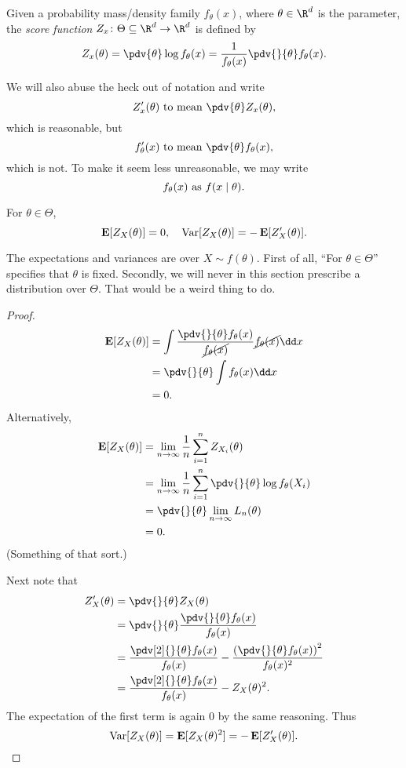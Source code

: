 \begin{definition*} \label{def:mle:convergence:score}
    Given a probability mass/density family $f_\theta(x)$,
    where $\theta \in \R^d$ is the parameter, the \emph{score function}
    $Z_x\colon \Theta \subseteq \R^d \to \R^d$ is defined by
    \[
        Z_x(\theta) = \pdv{\theta} \log f_\theta(x)
              = \frac1{f_\theta(x)} \pdv{}{\theta} f_\theta(x).
    \]
\end{definition*}
We will also abuse the heck out of notation and write \[
    Z_x'(\theta) \text{ to mean } \pdv{\theta} Z_x(\theta),
\] which is reasonable, but \[
    f_\theta'(x) \text{ to mean } \pdv{\theta} f_\theta(x),
\] which is not.
To make it seem less unreasonable, we may write \[
    f_\theta(x) \text{ as } f(x \mid \theta).
\]

\begin{lemma*}
    For $\theta \in \Theta$, \[
        \operatorname*{\textbf{E}}[Z_X(\theta)] = 0, \quad \operatorname*{Var}[Z_X(\theta)] = -\operatorname*{\textbf{E}}[Z'_X(\theta)].
    \]
\end{lemma*}
The expectations and variances are over $X \sim f(\theta)$.
First of all, ``For $\theta \in \Theta$'' specifies that $\theta$ is fixed.
Secondly, we will never in this section prescribe a distribution
over $\Theta$.
That would be a weird thing to do.
\begin{proof}
    \begin{align*}
        \E[Z_X(\theta)]
            &= \int \frac{\pdv{}{\theta}f_\theta(x)}{\cancel{f_\theta(x)}}
                                \cancel{f_\theta(x)} \dd x \\
            &= \pdv{}{\theta} \int f_\theta(x) \dd x \\
            &= 0.
    \end{align*}
    Alternatively, \begin{align*}
        \E[Z_X(\theta)]
            &= \lim_{n \to \infty} \frac1n \sum_{i=1}^n Z_{X_i}(\theta) \\
            &= \lim_{n \to \infty} \frac1n \sum_{i=1}^n \pdv{}{\theta} \log f_\theta(X_i) \\
            &= \pdv{}{\theta} \lim_{n \to \infty} L_n(\theta) \\
            &= 0.
    \end{align*} (Something of that sort.)

    Next note that \begin{align*}
        Z'_X(\theta) &= \pdv{}{\theta} Z_X(\theta) \\
            &= \pdv{}{\theta} \frac{\pdv{}{\theta} f_\theta(x)}{f_\theta(x)} \\
            &= \frac{\pdv[2]{}{\theta} f_\theta(x)}{f_\theta(x)}
                - \frac{\left(\pdv{}{\theta} f_\theta(x)\right)^2}{f_\theta(x)^2} \\
            &= \frac{\pdv[2]{}{\theta} f_\theta(x)}{f_\theta(x)}
                - Z_X(\theta)^2.
    \end{align*} The expectation of the first term is again $0$ by the
    same reasoning.
    Thus \[
        \operatorname*{Var}[Z_X(\theta)] = \operatorname*{\textbf{E}}[Z_X(\theta)^2]
            = -\operatorname*{\textbf{E}}[Z'_X(\theta)]. \qedhere
    \]
\end{proof}

